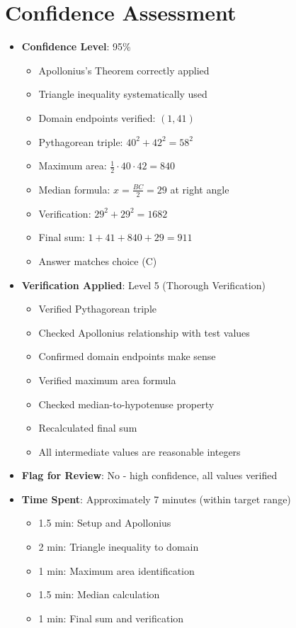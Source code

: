 \documentclass[12pt]{article}
\begin{document}
\section*{Confidence Assessment}
\begin{itemize}[leftmargin=*]
    \item \textbf{Confidence Level}: 95\%
    \begin{itemize}
        \item Apollonius's Theorem correctly applied
        \item Triangle inequality systematically used
        \item Domain endpoints verified: $(1, 41)$ \checkmark
        \item Pythagorean triple: $40^2 + 42^2 = 58^2$ \checkmark
        \item Maximum area: $\frac{1}{2} \cdot 40 \cdot 42 = 840$ \checkmark
        \item Median formula: $x = \frac{BC}{2} = 29$ at right angle \checkmark
        \item Verification: $29^2 + 29^2 = 1682$ \checkmark
        \item Final sum: $1 + 41 + 840 + 29 = 911$ \checkmark
        \item Answer matches choice (C)
    \end{itemize}
    
    \item \textbf{Verification Applied}: Level 5 (Thorough Verification)
    \begin{itemize}
        \item Verified Pythagorean triple
        \item Checked Apollonius relationship with test values
        \item Confirmed domain endpoints make sense
        \item Verified maximum area formula
        \item Checked median-to-hypotenuse property
        \item Recalculated final sum
        \item All intermediate values are reasonable integers
    \end{itemize}
    
    \item \textbf{Flag for Review}: No - high confidence, all values verified
    
    \item \textbf{Time Spent}: Approximately 7 minutes (within target range)
    \begin{itemize}
        \item 1.5 min: Setup and Apollonius
        \item 2 min: Triangle inequality to domain
        \item 1 min: Maximum area identification
        \item 1.5 min: Median calculation
        \item 1 min: Final sum and verification
    \end{itemize}
\end{itemize}
\end{document}
